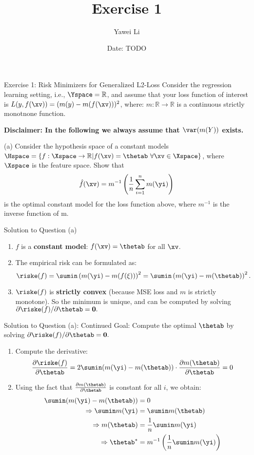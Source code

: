 \documentclass[aspectratio=169]{beamer}
\title[]{\textbf{Exercise 1}}
\author{Yawei Li}
\institute[LMU]
{
\\
  \texttt{yawei.li@stat.uni-muenchen.de}
}
\date{Date: TODO}
\begin{document}
\begin{frame}
\titlepage

\end{frame}

\begin{frame}{Exercise 1: Risk Minimizers for Generalized L2-Loss}
Consider the regression learning setting, i.e., $\Yspace = \mathbb{R}$, and assume that your loss function of interest is $L(y, f(\xv)) = (m(y) - m(f(\xv)))^2$, where: $m: \mathbb{R} \to \mathbb{R}$ is a continuous strictly monotnone function.

\textbf{Disclaimer: In the following we always assume that $\var(m(Y))$ exists.}

(a) Consider the hypothesis space of a constant models $\Hspace = \{f: \Xspace \rightarrow \mathbb{R} | f(\xv) = \thetab \ \forall \xv \in \Xspace \}$, where $\Xspace$ is the feature space. Show that 
$$
	\hat{f}(\xv) = m^{-1}\left( \frac{1}{n} \sum_{i=1}^n m(\yi) \right)
$$
is the optimal constant model for the loss function above, where $m^{-1}$ is the inverse function of m.
	
\end{frame}

\begin{frame}{Solution to Question (a)}
	\begin{enumerate}
		\item<1-> $f$ is a \textbf{constant model}: $f(\xv) = \thetab$ for all $\xv$.
		\item<2-> The empirical risk can be formulated as:
			$$\riske(f) = \sumin \left(m(\yi) - m(f(\xi)) \right)^2 = \sumin \left(m(\yi) - m(\thetab) \right)^2.$$
		\item<3-> $\riske(f)$ is \textbf{strictly convex} (because MSE loss and $m$ is strictly monotone). So the minimum is unique, and can be computed by solving $\partial{\riske(f)} / \partial \thetab = \bm{0}.$
	\end{enumerate}
\end{frame}

\begin{frame}{Solution to Question (a): Continued}
	Goal: Compute the optimal $\thetab$ by solving $\partial{\riske(f)} / \partial \thetab = \bm{0}.$
	
	\begin{enumerate}
		\small
		\item<1-> Compute the derivative: $$\frac{\partial \riske(f)}{\partial \thetab} = 2 \sumin (m(\yi) - m(\thetab)) \cdot \frac{\partial m(\thetab)}{\partial \thetab} = 0$$
		\item<2-> Using the fact that $\frac{\partial m(\thetab)}{\partial \thetab}$ is constant for all $i$, we obtain:
			\begin{align*}
				\sumin (m(\yi) - m(\thetab)) &= 0 \\
				\Rightarrow \sumin m(\yi) &= \sumin m(\thetab) \\
				\Rightarrow m(\thetab) &= \frac{1}{n} \sumin m(\yi) \\
				\Rightarrow \thetab^* &= m^{-1}\left(\frac{1}{n} \sumin m(\yi) \right)
			\end{align*}
	\end{enumerate}
\end{frame}
\end{document}
